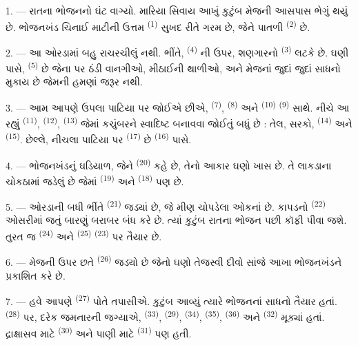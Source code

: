 \VUsaut{3.6mm}
\VUsaut{3.0mm}

1. --- રાતના ભોજનનો ઘંટ વાગ્યો. મારિયા સિવાય આખું કુટુંબ મેજની આસપાસ
ભેગું થયું છે. ભોજનખંડ ચિનાઈ માટીની ઉત્તમ 
\textsuperscript{(1)} સુખદ રીતે ગરમ છે, જેને પાતળી 
\textsuperscript{(2)} છે.

2. --- આ ઓરડામાં બહુ રાચરચીલું નથી. ભીંતે, 
\textsuperscript{(4)} ની ઉપર, શણગારનો 
\textsuperscript{(3)} લટકે છે. ઘણી પાસે, 
\textsuperscript{(5)} છે જેના પર ઠંડી વાનગીઓ, મીઠાઈની થાળીઓ, અને મેજનાં
જુદાં જુદાં સાધનો મુકાય છે જેમની હમણાં જરૂર નથી.

3. --- આમ આપણે ઉપલા પાટિયા પર જોઈએ છીએ, 
\textsuperscript{(7)},  \textsuperscript{(8)} અને
 \textsuperscript{(10)} 
\textsuperscript{(9)} સાથે. નીચે આ રહ્યું 
\textsuperscript{(11)},  \textsuperscript{(12)},
 \textsuperscript{(13)} જેમાં કચુંબરને સ્વાદિષ્ટ
બનાવવા જોઈતું બધું છે : તેલ, સરકો, 
\textsuperscript{(14)} અને  \textsuperscript{(15)}. છેલ્લે,
નીચલા પાટિયા પર  \textsuperscript{(17)} છે  \textsuperscript{(16)} પાસે.

4. --- ભોજનખંડનું ઘડિયાળ, જેને 
\textsuperscript{(20)} કહે છે, તેનો આકાર ઘણો ખાસ છે. તે લાકડાના
ચોકઠામાં જડેલું છે જેમાં  \textsuperscript{(19)} અને
 \textsuperscript{(18)} પણ છે.

\VUsaut{4.6mm}
\VUsaut{3.0mm}

5. --- ઓરડાની બધી ભીંતે 
\textsuperscript{(21)} જડ્યાં છે, જે મીણ ચોપડેલા ઓકનાં છે. કાપડનો
 \textsuperscript{(22)} ઓસરીમાં જતું બારણું બરાબર
બંધ કરે છે. ત્યાં કુટુંબ રાતના ભોજન પછી કૉફી પીવા જશે. તુરત જ
 \textsuperscript{(24)} અને 
\textsuperscript{(25)}  \textsuperscript{(23)} પર
તૈયાર છે.

6. --- મેજની ઉપર છતે  \textsuperscript{(26)} જડ્યો
છે જેનો ઘણો તેજસ્વી દીવો સાંજે આખા ભોજનખંડને પ્રકાશિત કરે છે.

7. --- હવે આપણે  \textsuperscript{(27)} પોતે તપાસીએ.
કુટુંબ આવ્યું ત્યારે ભોજનનાં સાધનો તૈયાર હતાં. 
\textsuperscript{(28)} પર, દરેક જમનારની જગ્યાએ, 
\textsuperscript{(33)},  \textsuperscript{(29)},
 \textsuperscript{(34)}, 
\textsuperscript{(35)},  \textsuperscript{(36)} અને
 \textsuperscript{(32)} મૂક્યાં હતાં. દ્રાક્ષાસવ માટે
 \textsuperscript{(30)} અને પાણી માટે  \textsuperscript{(31)} પણ હતી.

